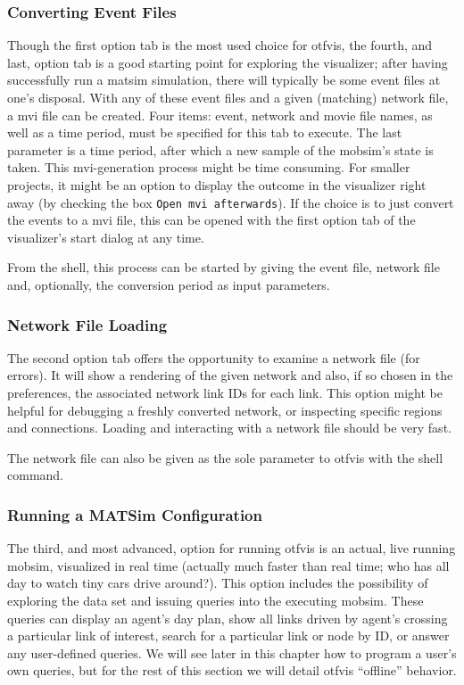 \subsubsection{Converting Event Files}
Though the first option tab is the most used choice for \gls{otfvis}, the fourth, and last, option tab is a good starting point for exploring the visualizer; after having successfully run a \gls{matsim} simulation, there will typically be some event files at one's disposal. With any of these event files and a given (matching) network file, a \gls{mvi} file can be created. 
Four items: event, network and movie file names, as well as a time period, must be specified for this tab to execute. 
The last parameter is a time period, after which a new sample of the \gls{mobsim}'s state is taken. 
This \gls{mvi}-generation process might be time consuming. For smaller projects, it might be an option to display the outcome in the visualizer right away (by checking the box \lstinline|Open mvi afterwards|). 
If the choice is to just convert the events to a \gls{mvi} file, this can be opened with the first option tab of the visualizer's start dialog at any time. 

From the shell, this process can be started by giving the event file, network file and, optionally, the conversion period as input parameters.

\subsubsection{Network File Loading}
The second option tab offers the opportunity to examine a network file (\eg for errors). 
It will show a rendering of the given network and also, if so chosen in the preferences, the associated network link IDs for each link. 
This option might be helpful for debugging a freshly converted network, or inspecting specific regions and connections. Loading and interacting with a network file should be very fast. 

The network file can also be given as the sole parameter to \gls{otfvis} with the shell command.

\subsubsection{Running a MATSim Configuration}
The third, and most advanced, option for running \gls{otfvis} is an actual, live running \gls{mobsim}, visualized in real time (actually much faster than real time; who has all day to watch tiny cars drive around?). This option includes the possibility of exploring the data set and issuing queries into the executing \gls{mobsim}. These queries can display an agent's day plan, show all links driven by agent's crossing a particular link of interest, search for a particular link or node by ID, or answer any user-defined queries. We will see later in this chapter how to program a user's own queries, but for the rest of this section we will detail \gls{otfvis} ``offline'' behavior. 

